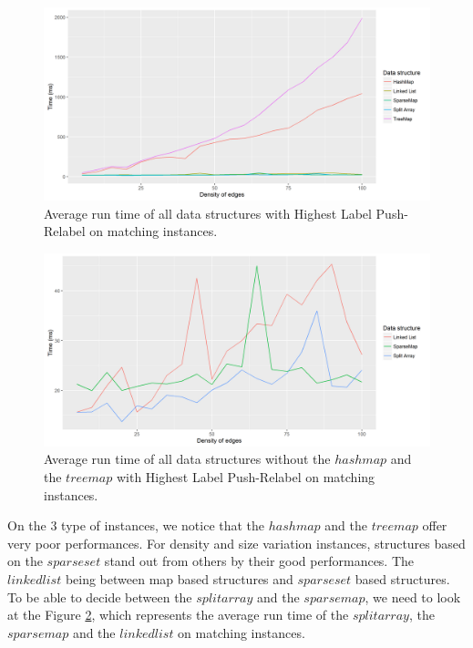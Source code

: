 \begin{figure}[H]
\begin{center}
\includegraphics[scale=0.5]{images/results/prmeanmatching.png}
\caption{Average run time of all data structures with Highest Label Push-Relabel on matching instances.}
\label{fig:prmeanmatching}
\end{center}
\end{figure}

\begin{figure}[H]
\begin{center}
\includegraphics[scale=0.5]{images/results/prmeanmatching2.png}
\caption{Average run time of all data structures without the $hashmap$ and the $treemap$ with Highest Label Push-Relabel on matching instances.}
\label{fig:prmeanmatching2}
\end{center}
\end{figure}
On the 3 type of instances, we notice that the $hashmap$ and the $treemap$ offer very poor performances. For density and size variation instances, structures based on the $sparse set$ stand out from others by their good performances. The $linked list$ being between map based structures and  $sparse set$ based structures. To be able to decide between the $split array$ and the $sparse map$, we need to look at the Figure \ref{fig:prmeanmatching2}, which represents the average run time of the $split array$, the $sparse map$ and the $linked list$ on matching instances.

